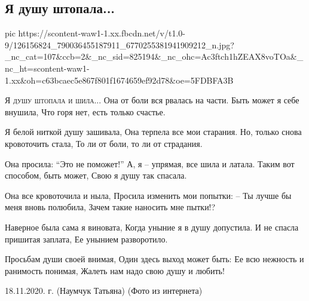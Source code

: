  
 
 

\subsection{Я душу штопала...}
\label{sec:18_11_2020.fb.tanya_naumchuk.1.ja_dushu_shtopala}

\ifcmt
pic https://scontent-waw1-1.xx.fbcdn.net/v/t1.0-9/126156824_790036455187911_6770255381941909212_n.jpg?_nc_cat=107&ccb=2&_nc_sid=825194&_nc_ohc=Ac3ftch1hZEAX8voTOa&_nc_ht=scontent-waw1-1.xx&oh=c63bcaec5e867f801f1674659ef92d78&oe=5FDBFA3B
\fi

\begin{multicols}{2}

\obeycr
\lettrine[lines=4]{Я}{ душу штопала и шила...}
Она от боли вся рвалась на части.
Быть может я себе внушила,
Что горя нет, есть только счастье.

Я белой ниткой душу зашивала,
Она терпела все мои старания.
Но, только снова кровоточить стала,
То ли от боли, то ли от страдания.

Она просила: \enquote{Это не поможет!}
А, я -- упрямая, все шила и латала.
Таким вот способом, быть может,
Свою я душу  так спасала.

Она все кровоточила и ныла,
Просила изменить мои попытки:
-- Ты лучше бы меня вновь полюбила,
Зачем такие наносить мне пытки!?

Наверное была сама я виновата,
Когда уныние я в душу допустила.
И не спасла пришитая заплата,
Ее унынием разворотило.

Просьбам души своей внимая,
Один здесь выход может быть:
Ее всю нежность и ранимость понимая,
Жалеть нам надо свою душу и любить!

18.11.2020. г. (Наумчук Татьяна) 
(Фото из интернета)
\restorecr
\end{multicols}
